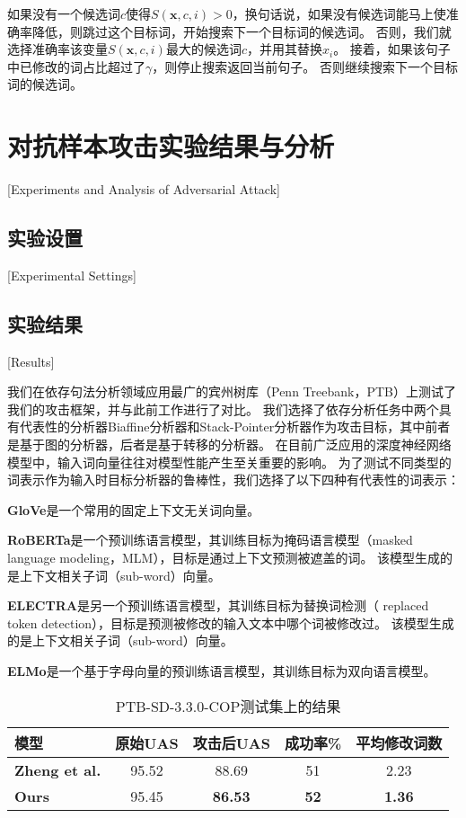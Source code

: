 如果没有一个候选词$c$使得$S(\mathbf{x},c,i) > 0$，换句话说，如果没有候选词能马上使准确率降低，则跳过这个目标词，开始搜索下一个目标词的候选词。
否则，我们就选择准确率该变量$S(\mathbf{x},c,i)$最大的候选词$c$，并用其替换$x_i$。
接着，如果该句子中已修改的词占比超过了$\gamma$，则停止搜索返回当前句子。
否则继续搜索下一个目标词的候选词。


\section{对抗样本攻击实验结果与分析}[Experiments and Analysis of Adversarial Attack]


\subsection{实验设置}[Experimental Settings]


\subsection{实验结果}[Results]

我们在依存句法分析领域应用最广的宾州树库（Penn Treebank，PTB）上测试了我们的攻击框架，并与此前工作进行了对比。
我们选择了依存分析任务中两个具有代表性的分析器Biaffine分析器\cite{dozat2017deep}和Stack-Pointer分析器\cite{ma2018stack}作为攻击目标，其中前者是基于图的分析器，后者是基于转移的分析器。
在目前广泛应用的深度神经网络模型中，输入词向量往往对模型性能产生至关重要的影响。
为了测试不同类型的词表示作为输入时目标分析器的鲁棒性，我们选择了以下四种有代表性的词表示：

\textbf{GloVe}\cite{pennington2014glove}是一个常用的固定上下文无关词向量。

\textbf{RoBERTa}\cite{liu2019roberta}是一个预训练语言模型，其训练目标为掩码语言模型（masked language modeling，MLM），目标是通过上下文预测被遮盖的词。 该模型生成的是上下文相关子词（sub-word）向量。

\textbf{ELECTRA}\cite{clark2020electra}是另一个预训练语言模型，其训练目标为替换词检测（ replaced token detection），目标是预测被修改的输入文本中哪个词被修改过。
该模型生成的是上下文相关子词（sub-word）向量。

\textbf{ELMo}\cite{peters2018deep}是一个基于字母向量的预训练语言模型，其训练目标为双向语言模型。 

\begin{table}[h]
	\centering
	\small
	\renewcommand{\arraystretch}{1.2}
	\begin{tabular}{l|cccc}
		\hline
		\bf 模型& \bf 原始UAS & \bf 攻击后UAS & \bf 成功率\% & \bf 平均修改词数 \\
		\hline
		\bf Zheng et al. & 95.52 & 88.69 & 51 & 2.23 \\
		\textbf{Ours} & 95.45 & \bf 86.53 & \bf 52 & \bf 1.36 \\
		\hline
	\end{tabular}
	\caption{PTB-SD-3.3.0-COP测试集上的结果} 
	\label{tbl:attack-cop}
\end{table}

